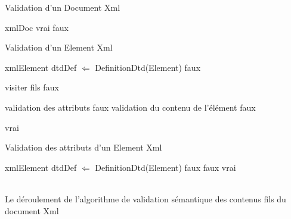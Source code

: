 \begin{algorithm}
\caption{Validation d'un Document Xml}
\label{ValidateXmlDoc}
\begin{algorithmic}
\REQUIRE xmlDoc 
       \RETURN vrai
\ELSE
        \RETURN faux
\ENDIF 
\end{algorithmic}
\end{algorithm}
\begin{algorithm}
\caption{Validation d'un Element Xml}
\label{ValidateXmlElement}
\begin{algorithmic}
\REQUIRE xmlElement 
\STATE dtdDef $\Leftarrow$ DefinitionDtd(Element)
       \RETURN faux
\ELSE

		\STATE visiter fils
			\RETURN faux
		\ENDIF
	\ENDFOR
	
	\STATE validation des attributs
		\RETURN faux
	\ENDIF
	\STATE validation du contenu de l'élément
		\RETURN faux
	\ENDIF

        \RETURN vrai
\ENDIF 
\end{algorithmic}
\end{algorithm}
\begin{algorithm}
\caption{Validation des attributs d'un Element Xml}
\label{CheckAttributes}
\begin{algorithmic}
\REQUIRE xmlElement 
\STATE dtdDef $\Leftarrow$ DefinitionDtd(Element)
       \RETURN faux
\ELSE
			\RETURN faux
		\ENDIF
	\ENDFOR
	\RETURN vrai
\ENDIF 
\end{algorithmic}
\end{algorithm}
~\\
Le déroulement de l'algorithme de validation sémantique des contenus fils du document Xml
